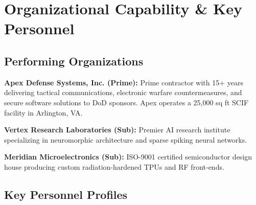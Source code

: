 \documentclass[10pt,a4paper]{article}
\begin{document}
\vspace{4pt}

\section{Organizational Capability \& Key Personnel}

\subsection{Performing Organizations}
\textbf{Apex Defense Systems, Inc. (Prime):} Prime contractor with 15+ years delivering tactical communications, electronic warfare countermeasures, and secure software solutions to DoD sponsors. Apex operates a 25,000 sq ft SCIF facility in Arlington, VA.

\noindent\textbf{Vertex Research Laboratories (Sub):} Premier AI research institute specializing in neuromorphic architecture and sparse spiking neural networks.

\noindent\textbf{Meridian Microelectronics (Sub):} ISO-9001 certified semiconductor design house producing custom radiation-hardened TPUs and RF front-ends.

\vspace{6pt}

\subsection{Key Personnel Profiles}
\end{document}
